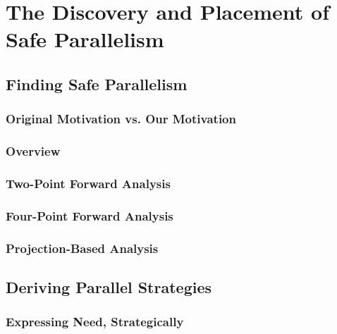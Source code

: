 \documentclass[dottedtoc, headinclude, footinclude=true, a4paper, numbers=noenddot]{scrreprt}
\begin{document}
\part{The Discovery and Placement of Safe Parallelism}
\label{part:static}

    \chapter{Finding Safe Parallelism}
    \label{chap:discovery} 
    

        \section{Original Motivation vs. Our Motivation}
        
    
        \section{Overview}
        \label{sec:strictnessOverview}
        
    
        \section{Two-Point Forward Analysis}
        \label{sec:twoPoint}
        
    
        \section{Four-Point Forward Analysis}
        \label{sec:fourPoint}
        
    
        \section{Projection-Based Analysis}
        \label{sec:projections}
        


    \chapter{Deriving Parallel Strategies}
    \label{chap:derivation}
    

        \section{Expressing Need, Strategically}
        \label{sec:derivations}
        
    
\end{document}
